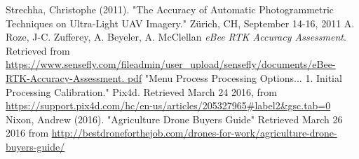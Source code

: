 \documentclass{article}
\begin{document}
\begin{thebibliography}{9}
Strechha,  Christophe (2011). "The Accuracy of Automatic Photogrammetric Techniques on Ultra-Light
UAV Imagery."  Zürich, CH, September
14-16, 2011
A. Roze, J-C. Zufferey, A. Beyeler, A. McClellan \textit{eBee RTK Accuracy Assessment}.
Retrieved from
\url{https://www.sensefly.com/fileadmin/user_upload/sensefly/documents/eBee-RTK-Accuracy-Assessment.
pdf}
"Menu Process Processing Options... 1. Initial Processing Calibration." Pix4d. Retrieved March 24
2016, from \url{https://support.pix4d.com/hc/en-us/articles/205327965#label2&gsc.tab=0}
Nixon, Andrew (2016). "Agriculture Drone Buyers Guide" Retrieved March 26 2016 from \url{http://bestdroneforthejob.com/drones-for-work/agriculture-drone-buyers-guide/}
\end{thebibliography}
\thispagestyle{lastpage}
\end{document}
